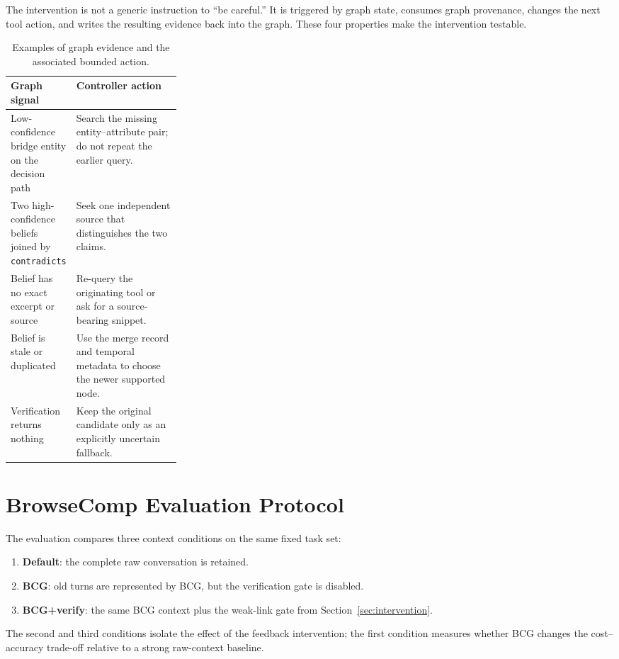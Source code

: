 \documentclass{article}
\begin{document}
The intervention is not a generic instruction to ``be careful.'' It is
triggered by graph state, consumes graph provenance, changes the next tool
action, and writes the resulting evidence back into the graph. These four
properties make the intervention testable.

\begin{table}[t]
\caption{Examples of graph evidence and the associated bounded action.}
\label{tab:actions}
\centering
\small
\begin{tabularx}{\linewidth}{@{}p{0.28\linewidth}X@{}}
\toprule
Graph signal & Controller action \\
\midrule
Low-confidence bridge entity on the decision path &
Search the missing entity--attribute pair; do not repeat the earlier query. \\
Two high-confidence beliefs joined by \texttt{contradicts} &
Seek one independent source that distinguishes the two claims. \\
Belief has no exact excerpt or source &
Re-query the originating tool or ask for a source-bearing snippet. \\
Belief is stale or duplicated &
Use the merge record and temporal metadata to choose the newer supported node. \\
Verification returns nothing &
Keep the original candidate only as an explicitly uncertain fallback. \\
\bottomrule
\end{tabularx}
\end{table}

\section{BrowseComp Evaluation Protocol}\label{sec:evaluation}

The evaluation compares three context conditions on the same fixed task set:
\begin{enumerate}[leftmargin=1.3em,itemsep=2pt,topsep=2pt]
  \item \textbf{Default}: the complete raw conversation is retained.
  \item \textbf{BCG}: old turns are represented by BCG, but the verification
    gate is disabled.
  \item \textbf{BCG+verify}: the same BCG context plus the weak-link gate from
    Section~\ref{sec:intervention}.
\end{enumerate}
The second and third conditions isolate the effect of the feedback intervention;
the first condition measures whether BCG changes the cost--accuracy trade-off
relative to a strong raw-context baseline.
\end{document}
